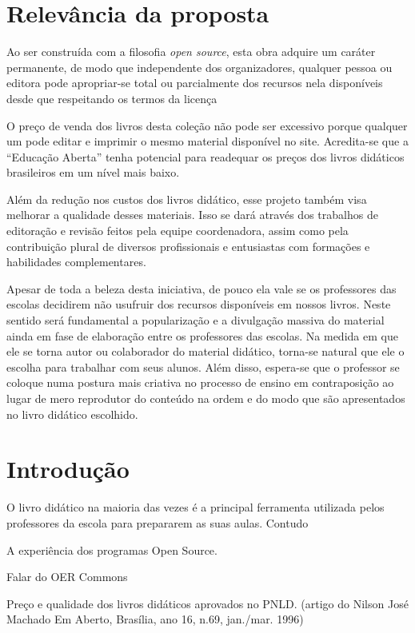 \documentclass[10 pt]{article}
\begin{document}
\section{Relevância da proposta}

Ao ser construída com a filosofia {\it open source}, esta obra adquire um caráter permanente, de modo que independente dos organizadores, qualquer pessoa ou editora pode apropriar-se total ou parcialmente dos recursos nela disponíveis desde que respeitando os termos da licença %

O preço de venda dos livros desta coleção não pode ser excessivo porque qualquer um pode editar e imprimir o mesmo material disponível no site.
Acredita-se que a ``Educação Aberta'' tenha potencial para readequar os preços dos livros didáticos brasileiros em um nível mais baixo.

Além da redução nos custos dos livros didático, esse projeto também visa melhorar a qualidade desses materiais.
Isso se dará através dos trabalhos de editoração e revisão feitos pela equipe coordenadora, assim como pela contribuição plural de diversos profissionais e entusiastas com formações e habilidades complementares.

Apesar de toda a beleza desta iniciativa, de pouco ela vale se os professores das escolas decidirem não usufruir dos recursos disponíveis em nossos livros.
Neste sentido será fundamental a popularização e a divulgação massiva do material ainda em fase de elaboração entre os professores das escolas.
Na medida em que ele se torna autor ou colaborador do material didático, torna-se natural que ele o escolha para trabalhar com seus alunos.
Além disso, espera-se que o professor se coloque numa postura mais criativa no processo de ensino em contraposição ao lugar de mero reprodutor do conteúdo na ordem e do modo que são apresentados no livro didático escolhido.


\section{Introdução}

O livro didático na maioria das vezes é a principal ferramenta utilizada pelos professores da escola para prepararem as suas aulas.
Contudo

A experiência dos programas Open Source.

Falar do OER Commons

Preço e qualidade dos livros didáticos aprovados no PNLD.
(artigo do Nilson José Machado Em Aberto, Brasília, ano 16, n.69, jan./mar.
1996)
\end{document}
